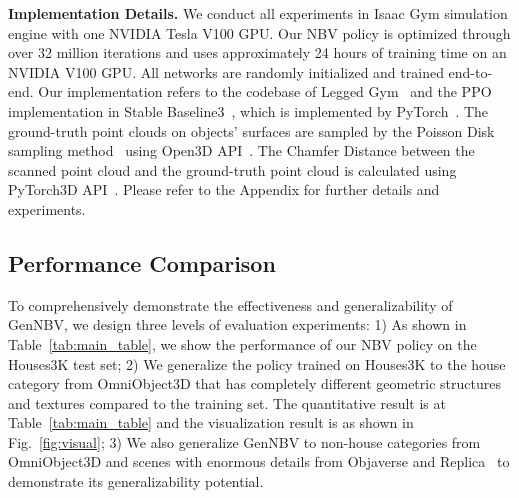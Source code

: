     \vspace{1pt}
    \noindent\textbf{Implementation Details.}
    We conduct all experiments in Isaac Gym simulation engine with one NVIDIA Tesla V100 GPU. Our NBV policy is optimized through over 32 million iterations and uses approximately 24 hours of training time on an NVIDIA V100 GPU. All networks are randomly initialized and trained end-to-end. Our implementation refers to the codebase of Legged Gym~\citep{rudinlearning} and the PPO implementation in Stable Baseline3~\citep{raffin2021stable}, which is implemented by PyTorch~\citep{paszke2019pytorch}. The ground-truth point clouds on objects' surfaces are sampled by the Poisson Disk sampling method~\citep{yuksel2015sample} using Open3D API~\citep{Zhou2018}. The Chamfer Distance between the scanned point cloud and the ground-truth point cloud is calculated using PyTorch3D API~\citep{ravi2020pytorch3d}. Please refer to the Appendix for further details and experiments.


\subsection{Performance Comparison}
    \label{sec:main_result}
    \vspace{-2pt}
    To comprehensively demonstrate the effectiveness and generalizability of GenNBV, we design three levels of evaluation experiments: 1) As shown in Table~\ref{tab:main_table}, we show the performance of our NBV policy on the Houses3K test set; 2) We generalize the policy trained on Houses3K to the house category from OmniObject3D that has completely different geometric structures and textures compared to the training set. The quantitative result is at Table~\ref{tab:main_table} and the visualization result is as shown in Fig.~\ref{fig:visual}; 3) We also generalize GenNBV to non-house categories from OmniObject3D and scenes with enormous details from Objaverse and Replica~\citep{straub2019replica} to demonstrate its generalizability potential.

